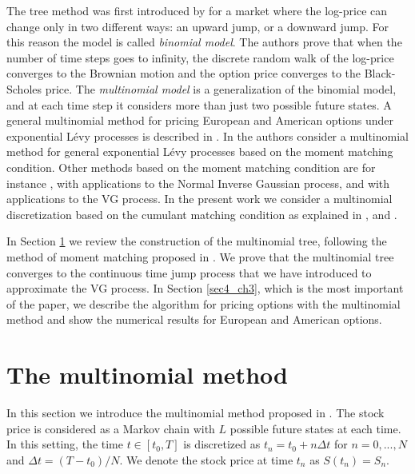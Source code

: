 The tree method was first introduced by \cite{CRR79} for a market where the log-price can change only in two different ways: 
an upward jump, or a downward jump. For this reason the model is called \emph{binomial model}. The authors 
prove that when the number of time steps goes to infinity, the discrete random walk of the log-price converges to the Brownian motion
and the option price converges to the Black-Scholes price.
The \emph{multinomial model} is a generalization of the binomial model, and at each time step it considers 
more than just two possible future states.
A general multinomial method for pricing European and American options under exponential L\'evy processes is described in \cite{MaSoSz}. 
In \cite{KeWe06} the authors consider a multinomial method for general exponential L\'evy processes based on the moment matching condition.
Other methods based on the moment matching condition are for instance \cite{HaMac10}, with applications to the Normal Inverse Gaussian process, and 
\cite{See13} with applications to the VG process.  
In the present work we consider a multinomial discretization based on the cumulant matching condition as explained in \cite{YaPr01}, \cite{YaPr03} and \cite{YaPr06}. 


In Section \ref{sec3_ch3} we review the construction of the multinomial tree, following the method of
moment matching proposed in \cite{YaPr01}. We prove that the multinomial tree converges to the continuous time jump process that we have
introduced to approximate the VG process.
In Section \ref{sec4_ch3}, which is the most important of the paper, we describe the algorithm for pricing options with the 
multinomial method and show the numerical results for European and American options.




\section{The multinomial method} \label{sec3_ch3}
In this section we introduce the multinomial method proposed in \cite{YaPr06}. 
The stock price is considered as a Markov chain with $L$ possible future states at each time. 
In this setting, the time $t \in [t_0,T]$ is discretized as $t_n = t_0 + n\Delta t$ for $n=0, ... ,N$ and 
$\Delta t = (T-t_0)/N$. We denote the stock price at time $t_n$ as $S(t_n) = S_n$.

